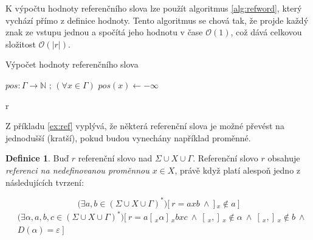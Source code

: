 \documentclass[thesis=B,czech]{FITthesis}[2019/12/23]
\theoremstyle{definition}
\newtheorem{definition}{Definice}[chapter]
\begin{document}
K výpočtu hodnoty referenčního slova lze použít algoritmus \ref{alg:refword}, který vychází přímo z definice hodnoty. Tento algoritmus se chová tak, že projde každý znak ze vstupu jednou a spočítá jeho hodnotu v čase $\mathcal{O}(1)$, což dává celkovou složitost $\mathcal{O}(|r|)$. 

\begin{algorithm}
		
  \caption{Výpočet hodnoty referenčního slova}\label{alg:refword}
	\DontPrintSemicolon
    $pos : \Gamma \rightarrow \mathbb{N}$ ; $(\forall x \in \Gamma)$ $pos(x) \gets -\infty$

\KwRet r
  
\end{algorithm}


Z příkladu \ref{ex:ref} vyplývá, že některá referenční slova je možné převést na jednodušší (kratší), pokud budou vynechány například  proměnné. 

\begin{definition}
Buď $r$ referenční slovo nad ${\Sigma \cup X \cup \Gamma}$. Referenční slovo $r$ obsahuje \emph{referenci na nedefinovanou proměnnou $x \in X$}, právě když platí alespoň jedno z následujících tvrzení:

	\begin{equation}\label{eq:ref1}\bigg (\exists  a, b \in \left(\Sigma \cup X \cup \Gamma\right)^\ast\bigg) \bigg [ \ r = a x b \ \wedge \ ]\,_x \notin a \ \bigg ]\end{equation}
	\begin{equation}\begin{split}\label{eq:ref2}&\bigg(\exists  \alpha, a, b, c \in \left(\Sigma \cup X \cup \Gamma\right)^\ast\bigg) \bigg [ \ r = a [\,_x \alpha  ]\,_x b x c \ \wedge \ [\,_x, ]\,_x \notin \alpha  \ \wedge \ [\,_x ,  ]\,_x \notin b \ \wedge \\&D \left( \alpha \right) = \varepsilon \ \bigg ] \end{split}\end{equation}
\end{definition}
\end{document}
